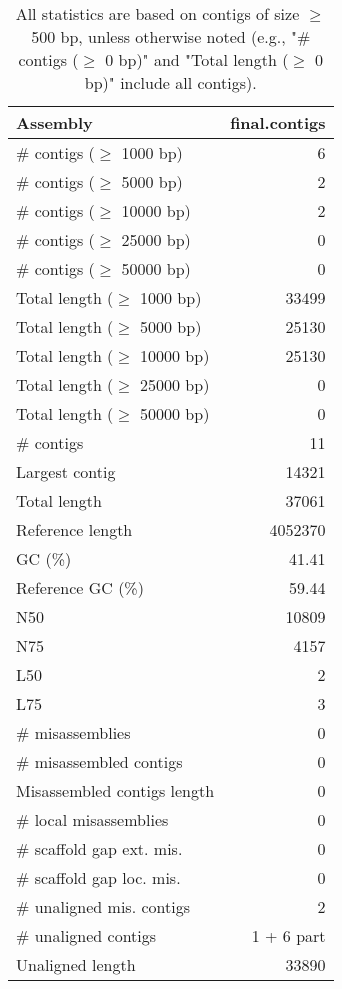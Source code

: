 \documentclass[12pt,a4paper]{article}
\begin{document}
\begin{table}[ht]
\begin{center}
\caption{All statistics are based on contigs of size $\geq$ 500 bp, unless otherwise noted (e.g., "\# contigs ($\geq$ 0 bp)" and "Total length ($\geq$ 0 bp)" include all contigs).}
\begin{tabular}{|l*{1}{|r}|}
\hline
Assembly & final.contigs \\ \hline
\# contigs ($\geq$ 1000 bp) & 6 \\ \hline
\# contigs ($\geq$ 5000 bp) & 2 \\ \hline
\# contigs ($\geq$ 10000 bp) & 2 \\ \hline
\# contigs ($\geq$ 25000 bp) & 0 \\ \hline
\# contigs ($\geq$ 50000 bp) & 0 \\ \hline
Total length ($\geq$ 1000 bp) & 33499 \\ \hline
Total length ($\geq$ 5000 bp) & 25130 \\ \hline
Total length ($\geq$ 10000 bp) & 25130 \\ \hline
Total length ($\geq$ 25000 bp) & 0 \\ \hline
Total length ($\geq$ 50000 bp) & 0 \\ \hline
\# contigs & 11 \\ \hline
Largest contig & 14321 \\ \hline
Total length & 37061 \\ \hline
Reference length & 4052370 \\ \hline
GC (\%) & 41.41 \\ \hline
Reference GC (\%) & 59.44 \\ \hline
N50 & 10809 \\ \hline
N75 & 4157 \\ \hline
L50 & 2 \\ \hline
L75 & 3 \\ \hline
\# misassemblies & 0 \\ \hline
\# misassembled contigs & 0 \\ \hline
Misassembled contigs length & 0 \\ \hline
\# local misassemblies & 0 \\ \hline
\# scaffold gap ext. mis. & 0 \\ \hline
\# scaffold gap loc. mis. & 0 \\ \hline
\# unaligned mis. contigs & 2 \\ \hline
\# unaligned contigs & 1 + 6 part \\ \hline
Unaligned length & 33890 \\ \hline

\end{tabular}
\end{center}
\end{table}
\end{document}
